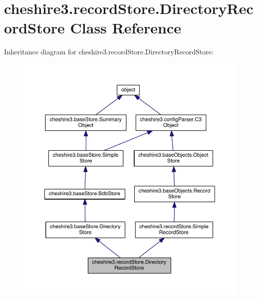 \hypertarget{classcheshire3_1_1record_store_1_1_directory_record_store}{\section{cheshire3.\-record\-Store.\-Directory\-Record\-Store Class Reference}
\label{classcheshire3_1_1record_store_1_1_directory_record_store}
}


Inheritance diagram for cheshire3.\-record\-Store.\-Directory\-Record\-Store\-:
\nopagebreak
\begin{figure}[H]
\begin{center}
\leavevmode
\includegraphics[width=350pt]{classcheshire3_1_1record_store_1_1_directory_record_store__inherit__graph}
\end{center}
\end{figure}


